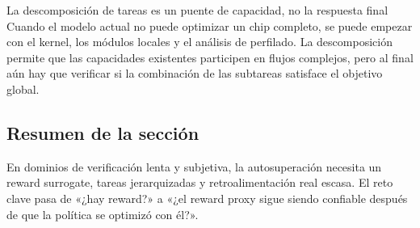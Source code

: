 \begin{knowledgebox}{La descomposición de tareas es un puente de capacidad, no la respuesta final}
Cuando el modelo actual no puede optimizar un chip completo, se puede empezar con el kernel, los módulos locales y el análisis de perfilado. La descomposición permite que las capacidades existentes participen en flujos complejos, pero al final aún hay que verificar si la combinación de las subtareas satisface el objetivo global.
\end{knowledgebox}

\subsection{Resumen de la sección}

En dominios de verificación lenta y subjetiva, la autosuperación necesita un reward surrogate, tareas jerarquizadas y retroalimentación real escasa. El reto clave pasa de «¿hay reward?» a «¿el reward proxy sigue siendo confiable después de que la política se optimizó con él?».
